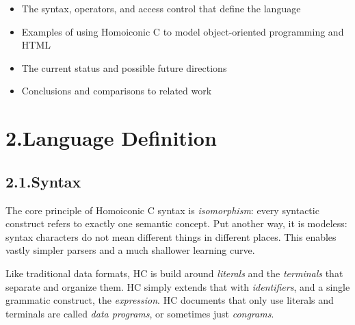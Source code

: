 \documentclass[preprint]{{acmart}}
\begin{document}
\begin{itemize}[noitemsep,topsep=\mdcompacttopsep]%

\item{}The syntax, operators, and access control that define the language%

\item{}Examples of using Homoiconic C to model object-oriented programming and HTML%

\item{}The current status and possible future directions%

\item{}Conclusions and comparisons to related work%
\end{itemize}%

\section{2.\hspace*{0.5em}Language Definition}\label{sec-language-definition}%

\subsection{2.1.\hspace*{0.5em}Syntax}\label{sec-syntax}%

\noindent{}The core principle of Homoiconic C syntax is \emph{isomorphism}: every
syntactic construct refers to exactly one semantic concept. Put another
way, it is modeless: syntax characters do not mean different things in different
places. This enables vastly simpler parsers and a much shallower learning
curve.%

Like traditional data formats, HC is build around \emph{literals} and the
\emph{terminals} that separate and organize them. HC simply extends that with
\emph{identifiers}, and a single grammatic construct, the \emph{expression}. HC
documents that only use literals and terminals are called \emph{data
programs}, or sometimes just \emph{congrams}.%
\end{document}
